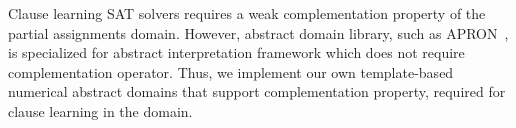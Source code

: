 Clause learning SAT solvers requires a weak complementation property 
of the partial assignments domain.  However,  abstract domain 
library, such as APRON~\cite{apron}, is specialized for abstract 
interpretation framework which does not require complementation 
operator.  Thus, we implement our own template-based numerical abstract 
domains that support complementation property, required for clause learning 
in the domain.  

